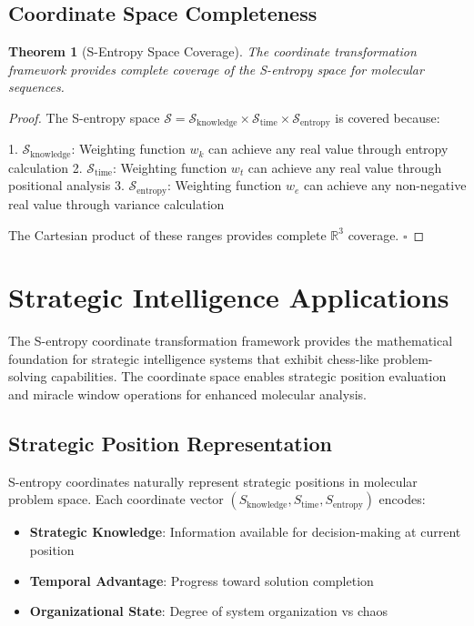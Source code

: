 \documentclass[12pt,a4paper]{article}
\newtheorem{theorem}{Theorem}
\begin{document}
\subsection{Coordinate Space Completeness}

\begin{theorem}[S-Entropy Space Coverage]
The coordinate transformation framework provides complete coverage of the S-entropy space for molecular sequences.
\end{theorem}

\begin{proof}
The S-entropy space $\mathcal{S} = \mathcal{S}_{\text{knowledge}} \times \mathcal{S}_{\text{time}} \times \mathcal{S}_{\text{entropy}}$ is covered because:

1. $\mathcal{S}_{\text{knowledge}}$: Weighting function $w_k$ can achieve any real value through entropy calculation
2. $\mathcal{S}_{\text{time}}$: Weighting function $w_t$ can achieve any real value through positional analysis
3. $\mathcal{S}_{\text{entropy}}$: Weighting function $w_e$ can achieve any non-negative real value through variance calculation

The Cartesian product of these ranges provides complete $\mathbb{R}^3$ coverage. $\square$
\end{proof}

\section{Strategic Intelligence Applications}

The S-entropy coordinate transformation framework provides the mathematical foundation for strategic intelligence systems that exhibit chess-like problem-solving capabilities. The coordinate space enables strategic position evaluation and miracle window operations for enhanced molecular analysis.

\subsection{Strategic Position Representation}

S-entropy coordinates naturally represent strategic positions in molecular problem space. Each coordinate vector $(S_{\text{knowledge}}, S_{\text{time}}, S_{\text{entropy}})$ encodes:

\begin{itemize}
\item \textbf{Strategic Knowledge}: Information available for decision-making at current position
\item \textbf{Temporal Advantage}: Progress toward solution completion 
\item \textbf{Organizational State}: Degree of system organization vs chaos
\end{itemize}
\end{document}

